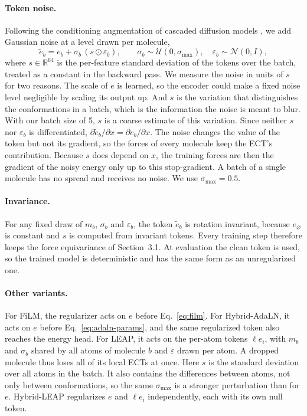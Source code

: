 \documentclass{article}
\newcommand{\R}{\mathbb{R}}
\newcommand{\enull}{e_{\varnothing}}
\begin{document}
\paragraph{Token noise.}
Following the conditioning augmentation of cascaded diffusion models \citep{ho2022cascaded}, we add Gaussian noise at a level drawn per molecule,
\begin{equation}
  \tilde e_b = e_b + \sigma_b\,(s\odot\varepsilon_b), \qquad \sigma_b\sim\mathcal U(0,\sigma_{\max}), \quad \varepsilon_b\sim\mathcal N(0,I),
  \label{eq:cond-noise}
\end{equation}
where $s\in\R^{64}$ is the per-feature standard deviation of the tokens over the batch, treated as a constant in the backward pass. We measure the noise in units of $s$ for two reasons. The scale of $e$ is learned, so the encoder could make a fixed noise level negligible by scaling its output up. And $s$ is the variation that distinguishes the conformations in a batch, which is the information the noise is meant to blur. With our batch size of 5, $s$ is a coarse estimate of this variation. Since neither $s$ nor $\varepsilon_b$ is differentiated, $\partial\tilde e_b/\partial x = \partial e_b/\partial x$. The noise changes the value of the token but not its gradient, so the forces of every molecule keep the ECT's contribution. Because $s$ does depend on $x$, the training forces are then the gradient of the noisy energy only up to this stop-gradient. A batch of a single molecule has no spread and receives no noise. We use $\sigma_{\max} = 0.5$.

\paragraph{Invariance.}
For any fixed draw of $m_b$, $\sigma_b$ and $\varepsilon_b$, the token $\tilde e_b$ is rotation invariant, because $\enull$ is constant and $s$ is computed from invariant tokens. Every training step therefore keeps the force equivariance of Section~3.1. At evaluation the clean token is used, so the trained model is deterministic and has the same form as an unregularized one.

\paragraph{Other variants.}
For FiLM, the regularizer acts on $e$ before Eq.~\eqref{eq:film}. For Hybrid-AdaLN, it acts on $e$ before Eq.~\eqref{eq:adaln-params}, and the same regularized token also reaches the energy head. For LEAP, it acts on the per-atom tokens $\ell e_i$, with $m_b$ and $\sigma_b$ shared by all atoms of molecule $b$ and $\varepsilon$ drawn per atom. A dropped molecule thus loses all of its local ECTs at once. Here $s$ is the standard deviation over all atoms in the batch. It also contains the differences between atoms, not only between conformations, so the same $\sigma_{\max}$ is a stronger perturbation than for $e$. Hybrid-LEAP regularizes $e$ and $\ell e_i$ independently, each with its own null token.
\end{document}

